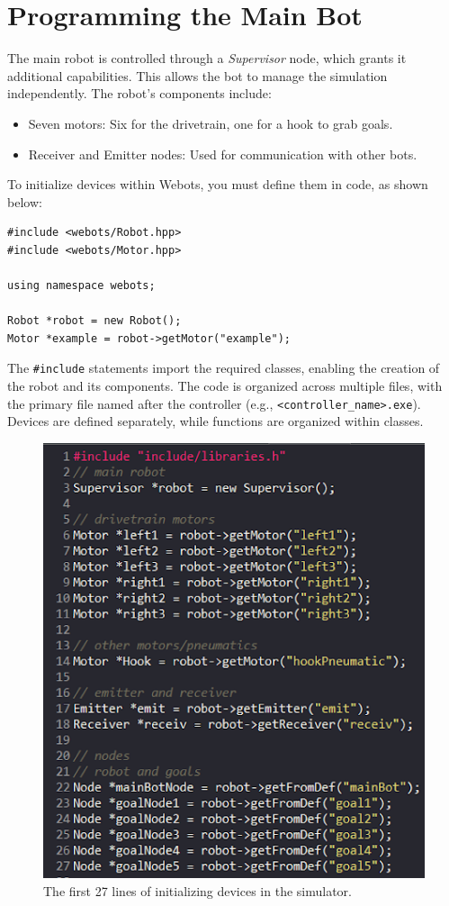 \section*{Programming the Main Bot}
The main robot is controlled through a \textit{Supervisor} node, which grants it additional capabilities. This allows the bot to manage the simulation independently. The robot’s components include:
\begin{itemize}
    \item Seven motors: Six for the drivetrain, one for a hook to grab goals.
    \item Receiver and Emitter nodes: Used for communication with other bots.
\end{itemize}

To initialize devices within Webots, you must define them in code, as shown below:

\begin{verbatim}
#include <webots/Robot.hpp>
#include <webots/Motor.hpp>

using namespace webots;

Robot *robot = new Robot();
Motor *example = robot->getMotor("example");
\end{verbatim}

The \verb|#include| statements import the required classes, enabling the creation of the robot and its components. The code is organized across multiple files, with the primary file named after the controller (e.g., \verb|<controller_name>.exe|). Devices are defined separately, while functions are organized within classes.

\begin{figure}[h]
    \centering
    \caption{The first 27 lines of initializing devices in the simulator.}
    \includegraphics[width=0.9\linewidth]{images/initalizing.png}
\end{figure}

